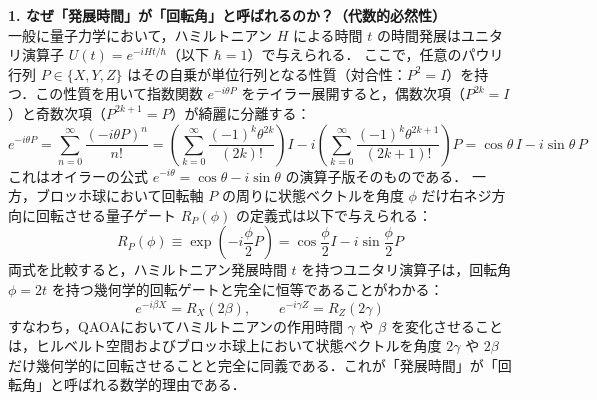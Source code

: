 \documentclass[11pt,a4paper,oneside,openany]{ltjsbook}
\theoremstyle{definition}
\theoremstyle{plain}
\theoremstyle{remark}
\begin{document}
\noindent\textbf{1. なぜ「発展時間」が「回転角」と呼ばれるのか？（代数的必然性）}\\[1.5mm]
一般に量子力学において，ハミルトニアン $H$ による時間 $t$ の時間発展はユニタリ演算子 $U(t) = e^{-i H t / \hbar}$（以下 $\hbar = 1$）で与えられる．
ここで，任意のパウリ行列 $P \in \{X, Y, Z\}$ はその自乗が単位行列となる性質（対合性：$P^2 = I$）を持つ．この性質を用いて指数関数 $e^{-i \theta P}$ をテイラー展開すると，偶数次項（$P^{2k} = I$）と奇数次項（$P^{2k+1} = P$）が綺麗に分離する：
\begin{equation}
    e^{-i \theta P} = \sum_{n=0}^\infty \frac{(-i\theta P)^n}{n!} = \left( \sum_{k=0}^\infty \frac{(-1)^k \theta^{2k}}{(2k)!} \right) I - i \left( \sum_{k=0}^\infty \frac{(-1)^k \theta^{2k+1}}{(2k+1)!} \right) P = \cos\theta \, I - i \sin\theta \, P
\end{equation}
これはオイラーの公式 $e^{-i\theta} = \cos\theta - i\sin\theta$ の演算子版そのものである．
一方，ブロッホ球において回転軸 $P$ の周りに状態ベクトルを角度 $\phi$ だけ右ネジ方向に回転させる量子ゲート $R_P(\phi)$ の定義式は以下で与えられる：
\begin{equation}
    R_P(\phi) \equiv \exp\left( -i \frac{\phi}{2} P \right) = \cos\frac{\phi}{2} I - i \sin\frac{\phi}{2} P
\end{equation}
両式を比較すると，ハミルトニアン発展時間 $t$ を持つユニタリ演算子は，回転角 $\phi = 2t$ を持つ幾何学的回転ゲートと完全に恒等であることがわかる：
\begin{equation}
    e^{-i \beta X} = R_X(2\beta), \qquad e^{-i \gamma Z} = R_Z(2\gamma)
\end{equation}
すなわち，QAOAにおいてハミルトニアンの作用時間 $\gamma$ や $\beta$ を変化させることは，ヒルベルト空間およびブロッホ球上において状態ベクトルを角度 $2\gamma$ や $2\beta$ だけ幾何学的に回転させることと完全に同義である．これが「発展時間」が「回転角」と呼ばれる数学的理由である．
\end{document}
